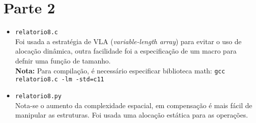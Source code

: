\documentclass{article}
\begin{document}
    \section*{Parte 2}
        \begin{itemize}
            \item \texttt{relatorio8.c} \\
            Foi usada a estratégia de VLA (\textit{variable-length array}) para
                evitar o uso de alocação dinâmica, outra facilidade foi a
                especificação de um macro para defnir uma função de tamanho. \\
            \textbf{Nota:} Para compilação, é necessário especificar biblioteca
                math: \texttt{gcc relatorio8.c -lm -std=c11}
            
            \item \texttt{relatorio8.py} \\
            Nota-se o aumento da complexidade espacial, em compensação é mais
                fácil de manipular as estruturas. Foi usada uma alocação
                estática para as operações.
        \end{itemize}
\end{document}
